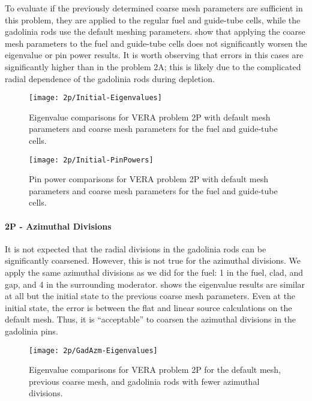 {{{{{          To evaluate if the previously determined coarse mesh parameters are sufficient in this problem, they are applied to the regular fuel and guide-tube cells, while the gadolinia rods use the default meshing parameters.
           show that applying the coarse mesh parameters to the fuel and guide-tube cells does not significantly worsen the eigenvalue or pin power results.
          It is worth observing that errors in this cases are significantly higher than in the problem 2A; this is likely due to the complicated radial dependence of the gadolinia rods during depletion.

          \begin{figure}
              \centering
              \texttt{[image: 2p/Initial-Eigenvalues]}
              \caption{Eigenvalue comparisons for VERA problem 2P with default mesh parameters and coarse mesh parameters for the fuel and guide-tube cells.\label{fig:LSMOC:2P:Default Mesh:Eigenvalues}}
          \end{figure}
          \begin{figure}
            \centering
            \texttt{[image: 2p/Initial-PinPowers]}
            \caption{Pin power comparisons for VERA problem 2P with default mesh parameters and coarse mesh parameters for the fuel and guide-tube cells.\label{fig:LSMOC:2P:Default Mesh:PinPowers}}
          \end{figure}
        }
        \paragraph{2P - Azimuthal Divisions}{
          It is not expected that the radial divisions in the gadolinia rods can be significantly coarsened.
          However, this is not true for the azimuthal divisions.
          We apply the same azimuthal divisions as we did for the fuel: 1 in the fuel, clad, and gap, and 4 in the surrounding moderator.
           shows the eigenvalue results are similar at all but the initial state to the previous coarse mesh parameters.
          Even at the initial state, the error is between the flat and linear source calculations on the default mesh.
          Thus, it is ``acceptable'' to coarsen the azimuthal divisions in the gadolinia pins.

          \begin{figure}
            \centering
            \texttt{[image: 2p/GadAzm-Eigenvalues]}
            \caption{Eigenvalue comparisons for VERA problem 2P for the default mesh, previous coarse mesh, and gadolinia rods with fewer azimuthal divisions.\label{fig:LSMOC:2P:Gad Azm:Eigenvalues}}
          \end{figure}
        }
}}}}
